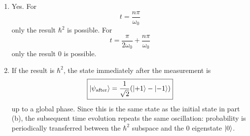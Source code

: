 \documentclass[11pt,a4paper]{scrartcl}
\begin{document}
\begin{enumerate}[label=(\alph*)]
        \begin{answerbox}
            \begin{enumerate}[label=(\roman*)]
                \item Yes. For
                \[
                    \boxed{t=\frac{n\pi}{\omega_0}}
                \]
                only the result $\hbar^2$ is possible. For
                \[
                    \boxed{t=\frac{\pi}{2\omega_0}+\frac{n\pi}{\omega_0}}
                \]
                only the result $0$ is possible.

                \item If the result is $\hbar^2$, the state immediately after the measurement is
                \[
                    \boxed{\ket{\psi_{\text{after}}}=\frac{1}{\sqrt{2}}(\ket{+1}-\ket{-1})}
                \]
                up to a global phase. Since this is the same state as the initial state in part (b), the subsequent time evolution repeats the same oscillation: probability is periodically transferred between the $\hbar^2$ subspace and the $0$ eigenstate $\ket{0}$.
            \end{enumerate}
        \end{answerbox}
    \end{enumerate}
\end{document}
